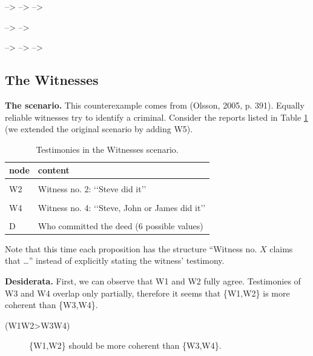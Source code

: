 \documentclass[
  10pt,
]{scrartcl}
\newcommand{\s}[1]{\textsf{#1}}
\begin{document}
--\textgreater{}
--\textgreater{}
--\textgreater{}

--\textgreater{}
--\textgreater{}

--\textgreater{}
--\textgreater{}
--\textgreater{}

\hypertarget{the-witnesses}{%
\subsection{The Witnesses}\label{the-witnesses}}

\textbf{The scenario.} This counterexample comes from (Olsson, 2005, p. 391). Equally reliable witnesses try to identify a criminal. Consider the reports listed in Table \ref{tab:witnessesProp} (we extended the original scenario by adding \s{W5}).

\begin{table}[H]

\caption{\label{tab:witnessesProp}Testimonies in the Witnesses scenario.}
\centering
\begin{tabular}[t]{ll}
\toprule
node & content\\
\midrule
\cellcolor{gray!6}{W1} & \cellcolor{gray!6}{Witness no. 1: ‘‘Steve did it’’}\\
W2 & Witness no. 2: ‘‘Steve did it’’\\
\cellcolor{gray!6}{W3} & \cellcolor{gray!6}{Witness no. 3: ‘‘Steve, Martin or David did it’’}\\
W4 & Witness no. 4: ‘‘Steve, John or James did it’’\\
\cellcolor{gray!6}{W5} & \cellcolor{gray!6}{Wittness no. 5: ‘‘Steve, John or Peter did it’’}\\
D & Who committed the deed (6  possible values)\\
\bottomrule
\end{tabular}
\end{table}

\noindent Note that this time each proposition has the structure ``Witness no. \(X\) claims that \dots'' instead of explicitly stating the witness' testimony.

\textbf{Desiderata.} First, we can observe that \s{W1} and \s{W2} fully agree. Testimonies of \s{W3} and \s{W4} overlap only partially, therefore it seems that \{\s{W1},\s{W2}\} is more coherent than \{\s{W3},\s{W4}\}.
\vspace{2mm}

\begin{description}
    \item[(\s{W1W2\textgreater W3W4})] \{\s{W1},\s{W2}\} should be more coherent than \{\s{W3},\s{W4}\}.
\end{description}\vspace{2mm}
\end{document}
